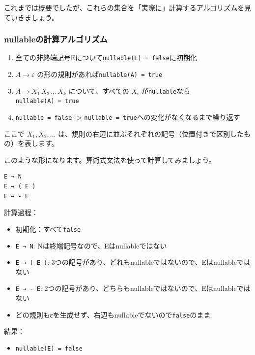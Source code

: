 これまでは概要でしたが、これらの集合を「実際に」計算するアルゴリズムを見ていきましょう。

\hypertarget{chapter5-nullableux306eux8a08ux7b97ux30a2ux30ebux30b4ux30eaux30baux30e0}{%
\subsubsection{nullableの計算アルゴリズム}\label{chapter5-nullableux306eux8a08ux7b97ux30a2ux30ebux30b4ux30eaux30baux30e0}}

\begin{enumerate}
\def\labelenumi{\arabic{enumi}.}
\tightlist
\item
  全ての非終端記号Eについて\texttt{nullable(E)\ =\ false}に初期化
\item
  \(A \to \varepsilon\) の形の規則があれば\texttt{nullable(A)\ =\ true}
\item
  \(A \to X_1\,X_2\,\ldots\,X_k\) について、すべての \(X_i\)
  が\texttt{nullable}なら\texttt{nullable(A)\ =\ true}
\item
        \texttt{nullable = false} -\textgreater{}
        \texttt{nullable = true}への変化がなくなるまで繰り返す
\end{enumerate}

ここで \(X_1, X_2, \ldots\)
は、規則の右辺に並ぶそれぞれの記号（位置付きで区別したもの）を表します。

このような形になります。算術式文法を使って計算してみましょう。

\begin{verbatim}
E → N
E → ( E )
E → - E
\end{verbatim}

計算過程：

\begin{itemize}
\tightlist
\item
  初期化：すべて\texttt{false}
\item
  \texttt{E\ →\ N}: Nは終端記号なので、Eはnullableではない
\item
  \texttt{E\ →\ (\ E\ )}:
  3つの記号があり、どれもnullableではないので、Eはnullableではない
\item
  \texttt{E\ →\ -\ E}:
  2つの記号があり、どちらもnullableではないので、Eはnullableではない
\item
  どの規則もεを生成せず、右辺もnullableでないので\texttt{false}のまま
\end{itemize}

結果：

\begin{itemize}
\tightlist
\item
  \texttt{nullable(E)\ =\ false}
\end{itemize}

